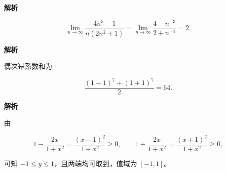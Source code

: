\begin{answer}

\textbf{解析}

\nopagebreak[4]
\[
\lim_{n\to\infty}\frac{4n^3-1}{n(2n^2+1)}
=\lim_{n\to\infty}\frac{4-n^{-3}}{2+n^{-1}}
=2.
\]


\textbf{解析}

偶次幂系数和为

\nopagebreak[4]
\[
\frac{(1-1)^7+(1+1)^7}{2}=64.
\]


\textbf{解析}

由

\nopagebreak[4]
\[
1-\frac{2x}{1+x^2}=\frac{(x-1)^2}{1+x^2}\ge0,
\qquad
1+\frac{2x}{1+x^2}=\frac{(x+1)^2}{1+x^2}\ge0,
\]

可知 $-1\le y\le1$，且两端均可取到，值域为 $[-1,1]$。






\end{answer}
